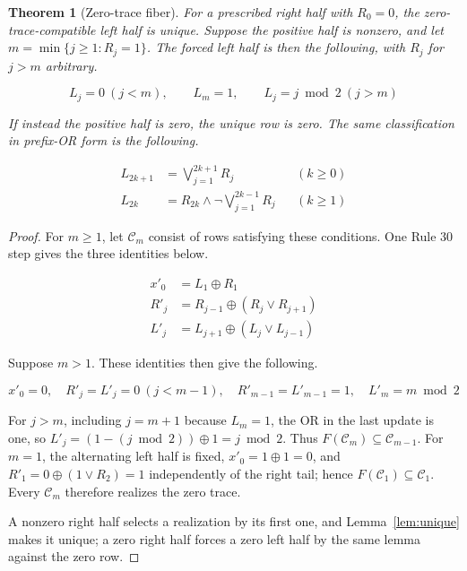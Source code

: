 \documentclass[10pt,a4paper]{amsart}
\newtheorem{theorem}{Theorem}
\begin{document}
\begin{theorem}[Zero-trace fiber]\label{thm:fiber}
For a prescribed right half with $R_0=0$, the zero-trace-compatible left half
is unique.  Suppose the positive half is nonzero, and let
$m=\min\{j\geq1:R_j=1\}$.  The forced left half is then the following, with
$R_j$ for $j>m$ arbitrary.

\begin{equation}\label{eq:pattern}
 L_j=0\ (j<m),\qquad L_m=1,\qquad L_j=j\bmod2\ (j>m)
\end{equation}

If instead the positive half is zero, the unique row is zero.  The same
classification in prefix-OR form is the following.

\begin{align}
 L_{2k+1}&=\bigvee_{j=1}^{2k+1}R_j &&(k\geq0) \label{eq:odd}\\[-2pt]
 L_{2k}&=R_{2k}\land\neg\!\bigvee_{j=1}^{2k-1}R_j &&(k\geq1) \label{eq:even}
\end{align}
\end{theorem}

\begin{proof}
For $m\geq1$, let $\mathcal C_m$ consist of rows satisfying these conditions.
One Rule 30 step gives the three identities below.

\begin{equation}\label{eq:updates}
\begin{aligned}
 x'_0&=L_1\oplus R_1\\
 R'_j&=R_{j-1}\oplus(R_j\lor R_{j+1})\\
 L'_j&=L_{j+1}\oplus(L_j\lor L_{j-1})
\end{aligned}
\end{equation}

Suppose $m>1$.  These identities then give the following.

\begin{equation}\label{eq:step}
 x'_0=0,\quad R'_j=L'_j=0\ (j<m-1),\quad R'_{m-1}=L'_{m-1}=1,
 \quad L'_m=m\bmod2
\end{equation}

For $j>m$, including $j=m+1$ because $L_m=1$, the OR in the last update is
one, so $L'_j=(1-(j\bmod2))\oplus1=j\bmod2$.  Thus
$F(\mathcal C_m)\subseteq\mathcal C_{m-1}$.  For $m=1$, the alternating left
half is fixed, $x'_0=1\oplus1=0$, and
$R'_1=0\oplus(1\lor R_2)=1$ independently of the right tail; hence
$F(\mathcal C_1)\subseteq\mathcal C_1$.  Every $\mathcal C_m$ therefore
realizes the zero trace.

A nonzero right half selects a realization by its first one, and
Lemma~\ref{lem:unique} makes it unique; a zero right half forces a zero left
half by the same lemma against the zero row.
\end{proof}
\end{document}
